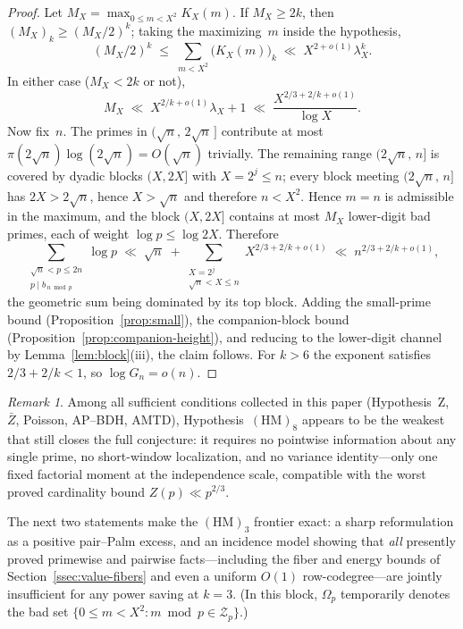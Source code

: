 \documentclass[11pt]{article}
\theoremstyle{definition}
\theoremstyle{remark}
\newtheorem{remark}[theorem]{Remark}
\begin{document}
\begin{proof}
Let $M_X = \max_{0 \le m < X^2} K_X(m)$.
If $M_X \ge 2k$, then $(M_X)_k \ge (M_X/2)^k$; taking the
maximizing~$m$ inside the hypothesis,
\[
  (M_X/2)^k
  \;\le\; \sum_{m<X^2}\bigl(K_X(m)\bigr)_k
  \;\ll\; X^{2+o(1)}\lambda_X^k .
\]
In either case ($M_X < 2k$ or not),
\[
  M_X \;\ll\; X^{2/k + o(1)} \lambda_X + 1
  \;\ll\; \frac{X^{2/3 + 2/k + o(1)}}{\log X}.
\]
Now fix~$n$. The primes in $(\sqrt n,\, 2\sqrt n\,]$
contribute at most
$\pi(2\sqrt n)\log(2\sqrt n) = O(\sqrt n)$ trivially.
The remaining range $(2\sqrt n,\, n]$ is covered by dyadic
blocks $(X, 2X]$ with $X = 2^j \le n$; every block meeting
$(2\sqrt n,\, n]$ has $2X > 2\sqrt n$, hence $X > \sqrt n$
and therefore $n < X^2$.
Hence $m = n$ is admissible in the maximum, and the block
$(X, 2X]$ contains at most $M_X$ lower-digit bad primes,
each of weight $\log p \le \log 2X$. Therefore
\[
  \sum_{\substack{\sqrt n < p \le 2n \\ p \mid b_{\,n \bmod p}}}
  \log p
  \;\ll\; \sqrt{n} \;+ \sum_{\substack{X = 2^j \\ \sqrt n < X \le n}}
    X^{2/3 + 2/k + o(1)}
  \;\ll\; n^{2/3 + 2/k + o(1)},
\]
the geometric sum being dominated by its top block.
Adding the small-prime bound
(Proposition~\ref{prop:small}), the companion-block bound
(Proposition~\ref{prop:companion-height}), and reducing to
the lower-digit channel by Lemma~\ref{lem:block}(iii),
the claim follows.
For $k > 6$ the exponent satisfies $2/3 + 2/k < 1$,
so $\log G_n = o(n)$.
\end{proof}

\begin{remark}
Among all sufficient conditions collected in this paper
(Hypothesis~Z, $\bar{Z}$, Poisson, AP--BDH, AMTD),
Hypothesis~$(\mathrm{HM})_8$ appears to be the weakest that
still closes the full conjecture: it requires no pointwise
information about any single prime, no short-window
localization, and no variance identity---only one fixed
factorial moment at the independence scale, compatible with
the worst proved cardinality bound $Z(p) \ll p^{2/3}$.
\end{remark}

The next two statements make the $(\mathrm{HM})_3$
frontier exact: a sharp reformulation as a positive
pair--Palm excess, and an incidence model showing that
\emph{all} presently proved primewise and pairwise
facts---including the fiber and energy bounds of
Section~\ref{ssec:value-fibers} and even a uniform
$O(1)$ row-codegree---are jointly insufficient for any
power saving at $k = 3$.
(In this block, $\Omega_p$ temporarily denotes the bad
set $\{0 \le m < X^2 : m \bmod p \in \mathcal Z_p\}$.)
\end{document}
